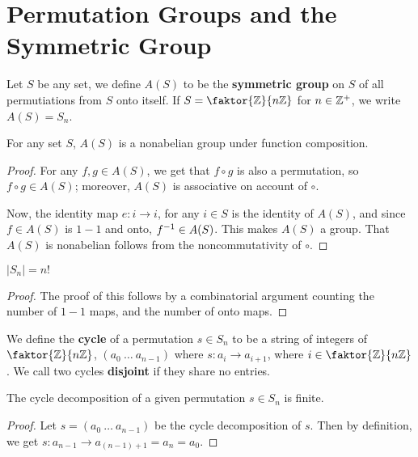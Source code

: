 \section{Permutation Groups and the Symmetric Group}
\label{section_1.3}

\begin{definition}
  Let $S$ be any set, we define $A(S)$ to be the \textbf{symmetric group} on
  $S$ of all permutiations from  $S$ onto itself. If  $S=\faktor{\Z}{n\Z}$ for
  $n \in \mathbb{Z}^+$, we write $A(S)=S_n$.
\end{definition}

\begin{theorem}\label{theorem_1.3.1}
  For any set $S$, $A(S)$ is a nonabelian group under function composition.
\end{theorem}
\begin{proof}
  For any $f,g \in A(S)$, we get that $f \circ g$ is also a permutation, so
  $f \circ g \in A(S)$; moreover, $A(S)$ is associative on account of $\circ$.

  Now, the identity map $e:i \rightarrow i$, for any $i \in S$ is the identity
  of $A(S)$, and since $f \in A(S)$ is $1-1$ and onto,  $f^{-1} \in A(S)$.
  This makes $A(S)$ a group. That $A(S)$ is nonabelian follows from the
  noncommutativity of $\circ$.
\end{proof}
\begin{corollary}
  $|S_n|=n!$
\end{corollary}
\begin{proof}
  The proof of this follows by a combinatorial argument counting the number of
  $1-1$ maps, and the number of onto maps.
\end{proof}

\begin{definition}
  We define the \textbf{cycle} of a permutation $s \in S_n$ to be a string of
  integers of  $\faktor{\Z}{n\Z}$, $(a_0 \ \dots \ a_{n-1})$ where $s:a_i
  \rightarrow a_{i+1}$, where $i \in \faktor{\Z}{n\Z}$. We call two cycles
  \textbf{disjoint} if they share no entries.
\end{definition}

\begin{proposition}\label{proposition_1.3.2}
  The cycle decomposition of a given permutation $s \in S_n$ is finite.
\end{proposition}
\begin{proof}
  Let $s=(a_0 \ \dots  \ a_{n-1})$ be the cycle decomposition of $s$. Then by
  definition, we get  $s:a_{n-1} \rightarrow a_{(n-1)+1}=a_n=a_0$.
\end{proof}

